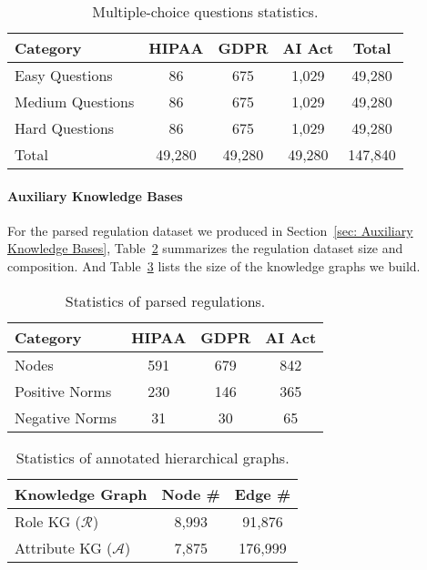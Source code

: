 \begin{table}[h]
\small
    \centering
    \setlength{\tabcolsep}{2pt}  
    \begin{tabular}{l|c|c|c|c}
        \toprule
        \textbf{Category} & \textbf{HIPAA} & \textbf{GDPR} & \textbf{AI Act} & \textbf{Total} \\
        \midrule
        Easy Questions  & 86 & 675 & 1,029  & 49,280 \\
        Medium Questions  & 86 & 675 & 1,029  & 49,280 \\
        Hard Questions  & 86 & 675 & 1,029  & 49,280 \\
        \midrule
        Total & 49,280 & 49,280 & 49,280  & 147,840 \\
        \bottomrule
    \end{tabular}
    \vspace{-0.1in}
    \caption{Multiple-choice questions statistics.}
    \label{tab:data_mc}
    \vspace{-0.15in}
\end{table}

\paragraph{Auxiliary Knowledge Bases}
For the parsed regulation dataset we produced in Section~\ref{sec: Auxiliary Knowledge Bases}, Table~\ref{tab:data_laws} summarizes the regulation dataset size and composition. 
And Table~\ref{tab:data_graphs} lists the size of the knowledge graphs we build.

\begin{table}[h]
\small
    \centering
    \begin{tabular}{l|c|c|c}
        \toprule
        \textbf{Category} & \textbf{HIPAA} & \textbf{GDPR} & \textbf{AI Act} \\
        \midrule
        Nodes & 591 & 679 & 842 \\
        Positive Norms & 230 & 146 & 365 \\
        Negative Norms & 31 & 30 & 65 \\
        \bottomrule
    \end{tabular}
    \vspace{-0.1in}
    \caption{Statistics of parsed regulations.}  \label{tab:data_laws}
    \vspace{-0.15in}
\end{table}

\begin{table}[h]
\small
    \centering
    \begin{tabular}{l|c c}
        \toprule
        \textbf{Knowledge Graph} & \textbf{Node \#} & \textbf{Edge \#} \\
        \midrule
        Role KG ($\mathcal{R}$) & 8,993 & 91,876  \\
        Attribute KG ($\mathcal{A}$) & 7,875 & 176,999  \\
        \bottomrule
    \end{tabular}
    \vspace{-0.1in}
    \caption{Statistics of annotated hierarchical graphs.}    \label{tab:data_graphs}
    \vspace{-0.15in}
\end{table}


